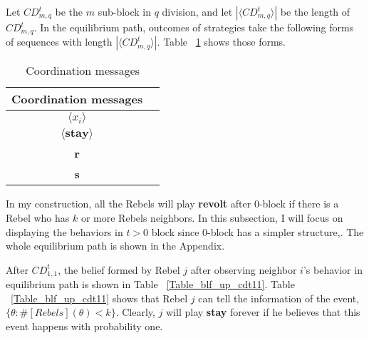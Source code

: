 \documentclass[12pt,letterpaper]{article}
\theoremstyle{definition}
\theoremstyle{remark}
\theoremstyle{claim}
\begin{document}
Let $CD^t_{m,q}$ be the $m$ sub-block in $q$ division, and let $|\langle CD^t_{m,q} \rangle|$ be the length of $CD^t_{m,q}$.  In the equilibrium path, outcomes of strategies take the following forms of sequences with length $|\langle CD^t_{m,q} \rangle|$. Table ~\ref{Table_msg_coordination} shows those forms.
\begin{table}[ht]
\caption{Coordination messages}
\label{Table_msg_coordination}
\begin{center}

\begin{tabular}{cc }
Coordination messages		&   \\
\hline
$\langle x_i \rangle$ 	& 	 \\
$\langle \textbf{stay} \rangle$	&   \\
\textbf{r}									& 	\\
\textbf{s}									& 	\\
\end{tabular}
\end{center}
\end{table}

In my construction, all the Rebels will play \textbf{revolt} after $0$-block if there is a Rebel who has $k$ or more Rebels neighbors. In this subsection, I will focus on displaying the behaviors in $t>0$ block since $0$-block has a simpler structure,. The whole equilibrium path is shown in the Appendix.

After $CD^t_{1,1}$, the belief formed by Rebel $j$ after observing neighbor $i$'s behavior in equilibrium path is shown in Table ~\ref{Table_blf_up_cdt11}. Table ~\ref{Table_blf_up_cdt11} shows that Rebel $j$ can tell the information of the event, $\{\theta:\#[Rebels](\theta)< k\}$. Clearly, $j$ will play \textbf{stay} forever if he believes that this event happens with probability one.
\end{document}
